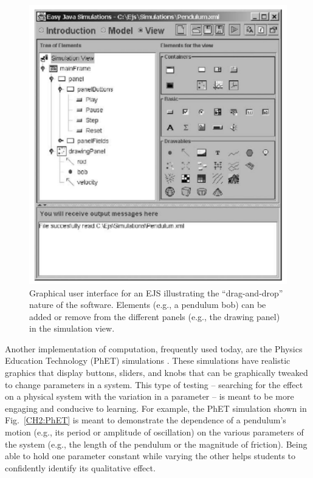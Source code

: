 \documentclass{msuphddissertation}
\begin{document}
\begin{doublespace}
\begin{figure}\center
\includegraphics[scale=0.40]{images/CH2EJS.pdf}
\caption{Graphical user interface for an EJS illustrating the ``drag-and-drop'' nature of the software.  Elements (e.g., a pendulum bob) can be added or remove from the different panels (e.g., the drawing panel) in the simulation view.}\label{CH2:EJS}
\end{figure}

Another implementation of computation, frequently used today, are the Physics Education Technology (PhET) simulations \cite{Perkins2006}.  These simulations have realistic graphics that display buttons, sliders, and knobs that can be graphically tweaked to change parameters in a system.  This type of testing -- searching for the effect on a physical system with the variation in a parameter -- is meant to be more engaging and conducive to learning.  For example, the PhET simulation shown in Fig.~\ref{CH2:PhET} is meant to demonstrate the dependence of a pendulum's motion (e.g., its period or amplitude of oscillation) on the various parameters of the system (e.g., the length of the pendulum or the magnitude of friction).  Being able to hold one parameter constant while varying the other helps students to confidently identify its qualitative effect.


\end{doublespace}
\end{document}

